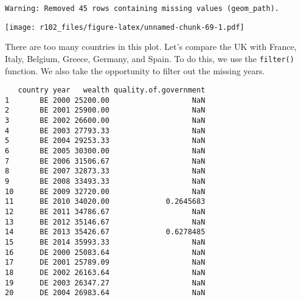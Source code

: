 \documentclass[]{article}
\newenvironment{Shaded}{\begin{snugshade}}{\end{snugshade}}
\newcommand{\DataTypeTok}[1]{\textcolor[rgb]{0.13,0.29,0.53}{#1}}
\newcommand{\DecValTok}[1]{\textcolor[rgb]{0.00,0.00,0.81}{#1}}
\newcommand{\KeywordTok}[1]{\textcolor[rgb]{0.13,0.29,0.53}{\textbf{#1}}}
\newcommand{\NormalTok}[1]{#1}
\newcommand{\OperatorTok}[1]{\textcolor[rgb]{0.81,0.36,0.00}{\textbf{#1}}}
\newcommand{\StringTok}[1]{\textcolor[rgb]{0.31,0.60,0.02}{#1}}
\begin{document}
\begin{Shaded}
\end{Shaded}

\begin{verbatim}
Warning: Removed 45 rows containing missing values (geom_path).
\end{verbatim}

\texttt{[image: r102\_files/figure-latex/unnamed-chunk-69-1.pdf]}

There are too many countries in this plot. Let's compare the UK with France, Italy, Belgium, Greece, Germany, and Spain. To do this, we use the \texttt{filter()} function. We also take the opportunity to filter out the missing years.

\begin{Shaded}
\end{Shaded}

\begin{verbatim}
   country year   wealth quality.of.government
1       BE 2000 25200.00                   NaN
2       BE 2001 25900.00                   NaN
3       BE 2002 26600.00                   NaN
4       BE 2003 27793.33                   NaN
5       BE 2004 29253.33                   NaN
6       BE 2005 30300.00                   NaN
7       BE 2006 31506.67                   NaN
8       BE 2007 32873.33                   NaN
9       BE 2008 33493.33                   NaN
10      BE 2009 32720.00                   NaN
11      BE 2010 34020.00             0.2645683
12      BE 2011 34786.67                   NaN
13      BE 2012 35146.67                   NaN
14      BE 2013 35426.67             0.6278485
15      BE 2014 35993.33                   NaN
16      DE 2000 25083.64                   NaN
17      DE 2001 25789.09                   NaN
18      DE 2002 26163.64                   NaN
19      DE 2003 26347.27                   NaN
20      DE 2004 26983.64                   NaN
\end{verbatim}
\end{document}
